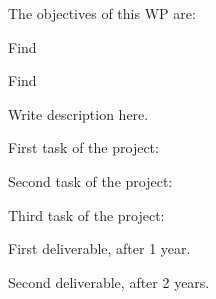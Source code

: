 \begin{workpackage}[id=WPcontrol,wphases=0-48,
  short=Noneq. control, %
  title=Nonequilibrium control, %
  lead=KUL,
  KULRM=12]

\begin{wpobjectives}
  The objectives of this WP are:
  \begin{compactitem}
  \item Find 
  \item Find 
  \end{compactitem}
\end{wpobjectives}

\begin{wpdescription}

Write description here.

\end{wpdescription}

\begin{tasklist}

  \begin{task}[title=TASK1,id=task1,PM=15,lead=KUL,wphases=0-12!0.5]

    First task of the project: 

  \end{task}

  \begin{task}[title=TASK2,id=task2,PM=15,lead=KUL,wphases=9-24!0.5]

    Second task of the project: 

  \end{task}

  \begin{task}[title=TASK3,id=task3,PM=15,lead=KUL,wphases=12-45!1.0]

    Third task of the project: 

    
  \end{task}


\end{tasklist}

\begin{wpdelivs}
  \begin{wpdeliv}[due=12,id=mydeliv1,dissem=PU,nature=DEM,lead=Padova]
      {First deliverable, after 1 year.}
  \end{wpdeliv}
  \begin{wpdeliv}[due=24,id=mydeliv2,dissem=PU,nature=DEM,lead=PAR2]
      {Second deliverable, after 2 years.}
\end{wpdeliv}
\end{wpdelivs}

\end{workpackage}
